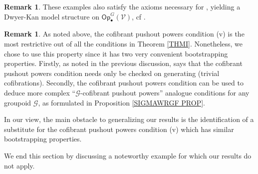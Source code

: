 \documentclass[a4paper,10pt
,draft
]{article}%
\numberwithin{equation}{section}
\numberwithin{figure}{section}
\theoremstyle{definition} %
\newtheorem{remark}[equation]{Remark}%
\newcommand{\Op}{\mathsf{Op}}%
\newcommand{\V}{\ensuremath{\mathcal V}}
\newcommand{\G}{\ensuremath{\mathcal G}}
\newcommand{\1}{\ensuremath{\mathbbm 1}}%
\begin{document}
\begin{remark}
        These examples also satisfy the axioms necessary for \cite[Thm. \ref{AC-THMA}]{BP_ACOP},
        yielding a Dwyer-Kan model structure on $\Op_\bullet^G(\V)$, cf \cite[\S \ref{AC-EXAMPLES SEC}]{BP_ACOP}.
\end{remark}


\begin{remark}\label{CPPWHY REM}
	As noted above, the cofibrant pushout powers
	condition (v) is the most restrictive 
	out of all the conditions in 
	Theorem \ref{THMI}. %
	Nonetheless, we chose to use this property 
	since it has two very convenient bootstrapping properties.
	Firstly, as noted in the previous discussion, \cite[Rem. 6.17]{BP_geo}
	says that the cofibrant pushout powers condition needs only be checked on generating (trivial cofibrations).
	Secondly, the cofibrant pushout powers condition 
	can be used to deduce more complex
	``$\G$-cofibrant pushout powers'' analogue conditions for any groupoid $\G$,
	as formulated in Proposition \ref{SIGMAWRGF PROP}.
	
	In our view, the main obstacle to generalizing our results is the identification of 
	a substitute for the cofibrant pushout powers condition (v)
	which has similar bootstrapping properties.
\end{remark}



We end this section by discussing a noteworthy 
example for which our results do not apply.
\end{document}
